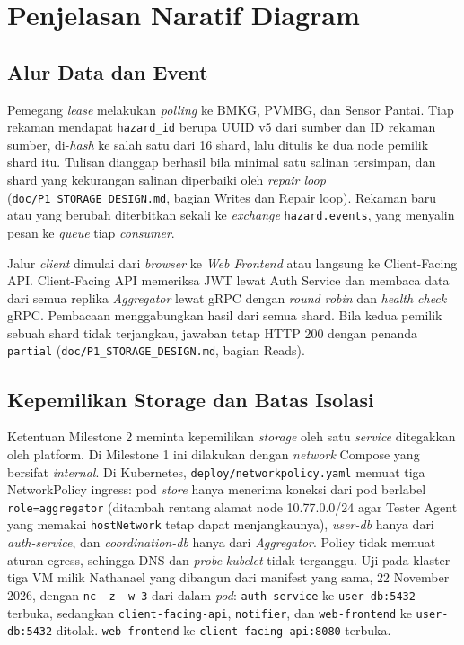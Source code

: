 \section{Penjelasan Naratif Diagram}

\subsection{Alur Data dan Event}

Pemegang \textit{lease} melakukan \textit{polling} ke BMKG, PVMBG, dan Sensor Pantai. Tiap rekaman mendapat \texttt{hazard\_id} berupa UUID v5 dari sumber dan ID rekaman sumber, di-\textit{hash} ke salah satu dari 16 shard, lalu ditulis ke dua node pemilik shard itu. Tulisan dianggap berhasil bila minimal satu salinan tersimpan, dan shard yang kekurangan salinan diperbaiki oleh \textit{repair loop} (\texttt{doc/P1\_STORAGE\_DESIGN.md}, bagian Writes dan Repair loop). Rekaman baru atau yang berubah diterbitkan sekali ke \textit{exchange} \texttt{hazard.events}, yang menyalin pesan ke \textit{queue} tiap \textit{consumer}.

Jalur \textit{client} dimulai dari \textit{browser} ke \textit{Web Frontend} atau langsung ke Client-Facing API. Client-Facing API memeriksa JWT lewat Auth Service dan membaca data dari semua replika \textit{Aggregator} lewat gRPC dengan \textit{round robin} dan \textit{health check} gRPC. Pembacaan menggabungkan hasil dari semua shard. Bila kedua pemilik sebuah shard tidak terjangkau, jawaban tetap HTTP 200 dengan penanda \texttt{partial} (\texttt{doc/P1\_STORAGE\_DESIGN.md}, bagian Reads).

\subsection{Kepemilikan Storage dan Batas Isolasi}

Ketentuan Milestone 2 meminta kepemilikan \textit{storage} oleh satu \textit{service} ditegakkan oleh platform. Di Milestone 1 ini dilakukan dengan \textit{network} Compose yang bersifat \textit{internal}. Di Kubernetes, \texttt{deploy/networkpolicy.yaml} memuat tiga NetworkPolicy ingress: pod \textit{store} hanya menerima koneksi dari pod berlabel \texttt{role=aggregator} (ditambah rentang alamat node 10.77.0.0/24 agar Tester Agent yang memakai \texttt{hostNetwork} tetap dapat menjangkaunya), \textit{user-db} hanya dari \textit{auth-service}, dan \textit{coordination-db} hanya dari \textit{Aggregator}. Policy tidak memuat aturan egress, sehingga DNS dan \textit{probe} \textit{kubelet} tidak terganggu. Uji pada klaster tiga VM milik Nathanael yang dibangun dari manifest yang sama, 22 November 2026, dengan \texttt{nc -z -w 3} dari dalam \textit{pod}: \texttt{auth-service} ke \texttt{user-db:5432} terbuka, sedangkan \texttt{client-facing-api}, \texttt{notifier}, dan \texttt{web-frontend} ke \texttt{user-db:5432} ditolak. \texttt{web-frontend} ke \texttt{client-facing-api:8080} terbuka.

